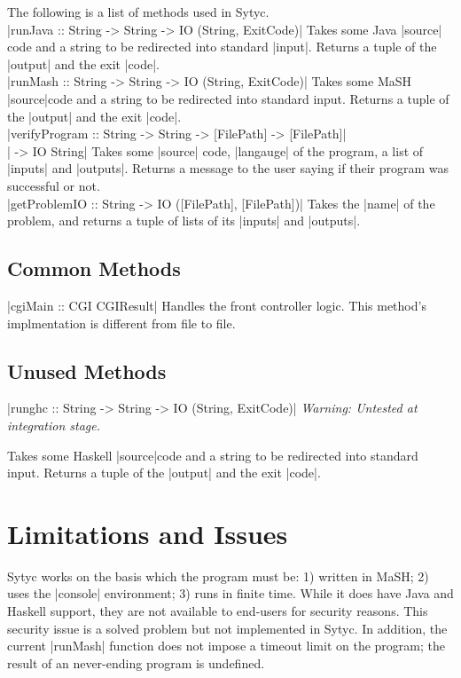 \documentclass[a4paper]{article}
\begin{document}
The following is a list of methods used in Sytyc.\\

|runJava :: String -> String -> IO (String, ExitCode)|
\vskip 0.1in
Takes some Java |source| code and a string to be redirected into standard |input|.  Returns a tuple of the |output| and the exit |code|.\\

|runMash :: String -> String -> IO (String, ExitCode)|
\vskip 0.1in
Takes some MaSH |source|code and a string to be redirected into standard input.   Returns a tuple of the |output| and the exit |code|.\\

|verifyProgram :: String -> String -> [FilePath] -> [FilePath]|\\
|                 -> IO String|
\vskip 0.1in
Takes some |source| code, |langauge| of the program, a list of |inputs| and |outputs|.  Returns a message to the user saying if their program was successful or not. \\

|getProblemIO :: String -> IO ([FilePath], [FilePath])|
\vskip 0.1in
Takes the |name| of the problem, and returns a tuple of lists of its |inputs| and |outputs|.\\\pagebreak

\subsection{Common Methods}

|cgiMain :: CGI CGIResult|
\vskip 0.1in
Handles the front controller logic.  This method's implmentation is different from file to file.

\subsection{Unused Methods}

|runghc :: String -> String -> IO (String, ExitCode)|
\vskip 0.1in
{\em Warning: Untested at integration stage.}

Takes some Haskell |source|code and a string to be redirected into standard input.   Returns a tuple of the |output| and the exit |code|.

\section{Limitations and Issues}

Sytyc works on the basis which the program must be: 1) written in MaSH; 2) uses the |console| environment; 3) runs in finite time.  While it does have Java and Haskell support, they are not available to end-users for security reasons.  This security issue is a solved problem but not implemented in Sytyc.  In addition, the current |runMash| function does not impose a timeout limit on the program; the result of an never-ending program is undefined.
\end{document}
